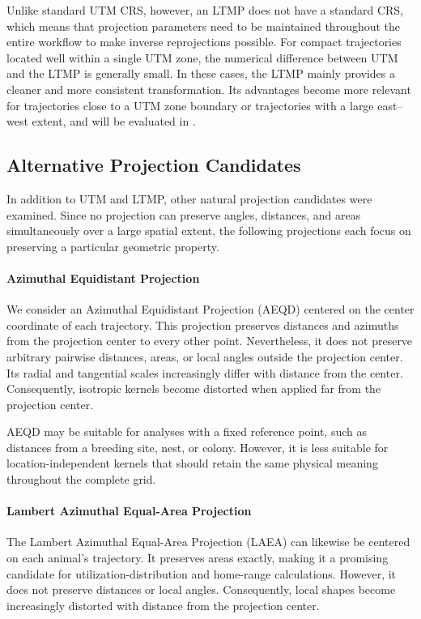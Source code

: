 Unlike standard UTM CRS, however, an LTMP does not have a standard CRS, which means that projection parameters need to be maintained 
throughout the entire workflow to make inverse reprojections possible.
For compact trajectories located well within a single UTM zone, the numerical difference between UTM and the LTMP is generally 
small. In these cases, the LTMP mainly provides a cleaner and more consistent transformation. 
Its advantages become more relevant for trajectories close to a UTM zone boundary or trajectories with a large east--west extent, and will be evaluated in .

\subsection{Alternative Projection Candidates}
In addition to UTM and LTMP, other natural projection candidates were examined. Since no projection can preserve angles, distances, and areas simultaneously over a large spatial extent,
 the following projections each focus on preserving a particular geometric property.

\paragraph{Azimuthal Equidistant Projection}
We consider an Azimuthal Equidistant Projection (AEQD) centered on the center coordinate of each trajectory. This projection preserves distances and azimuths from the projection center to every other point. 
Nevertheless, it does not preserve arbitrary pairwise distances, areas, or local angles outside the projection center. Its radial and tangential scales increasingly differ with distance from the center. 
Consequently, isotropic kernels become distorted when applied far from the projection center.

AEQD may be suitable for analyses with a fixed reference point, such as distances from a breeding site, nest, or colony. 
However, it is less suitable for location-independent kernels that should retain the same physical meaning throughout the complete grid.

\paragraph{Lambert Azimuthal Equal-Area Projection}
The Lambert Azimuthal Equal-Area Projection (LAEA) can likewise be centered on each animal's trajectory. It preserves areas exactly, making it a promising candidate for utilization-distribution and home-range calculations. However, it does not preserve distances or local angles. Consequently, local shapes become increasingly distorted with distance from the projection center.

